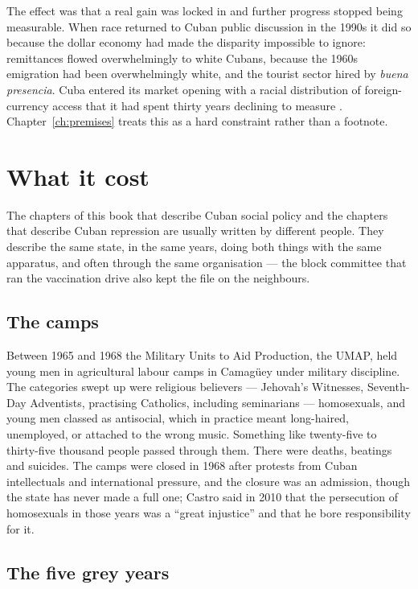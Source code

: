 The effect was that a real gain was locked in and further progress stopped
being measurable. When race returned to Cuban public discussion in the 1990s it
did so because the dollar economy had made the disparity impossible to ignore:
remittances flowed overwhelmingly to white Cubans, because the 1960s emigration
had been overwhelmingly white, and the tourist sector hired by
\emph{buena presencia}. Cuba entered its market opening with a racial
distribution of foreign-currency access that it had spent thirty years
declining to measure \citep{delafuente2001}. Chapter~\ref{ch:premises} treats this as a hard
constraint rather than a footnote.

\section{What it cost}

The chapters of this book that describe Cuban social policy and the chapters
that describe Cuban repression are usually written by different people. They
describe the same state, in the same years, doing both things with the same
apparatus, and often through the same organisation --- the block committee that
ran the vaccination drive also kept the file on the neighbours.

\subsection{The camps}

Between 1965 and 1968 the Military Units to Aid Production, the UMAP, held
young men in agricultural labour camps in Camag\"uey under military discipline.
The categories swept up were religious believers --- Jehovah's Witnesses,
Seventh-Day Adventists, practising Catholics, including seminarians ---
homosexuals, and young men classed as antisocial, which in practice meant
long-haired, unemployed, or attached to the wrong music. Something like
twenty-five to thirty-five thousand people passed through them.\unv{} There
were deaths, beatings and suicides. The camps were closed in 1968 after
protests from Cuban intellectuals and international pressure, and the closure
was an admission, though the state has never made a full one; Castro said in
2010 that the persecution of homosexuals in those years was a ``great
injustice'' and that he bore responsibility for it.

\subsection{The five grey years}

